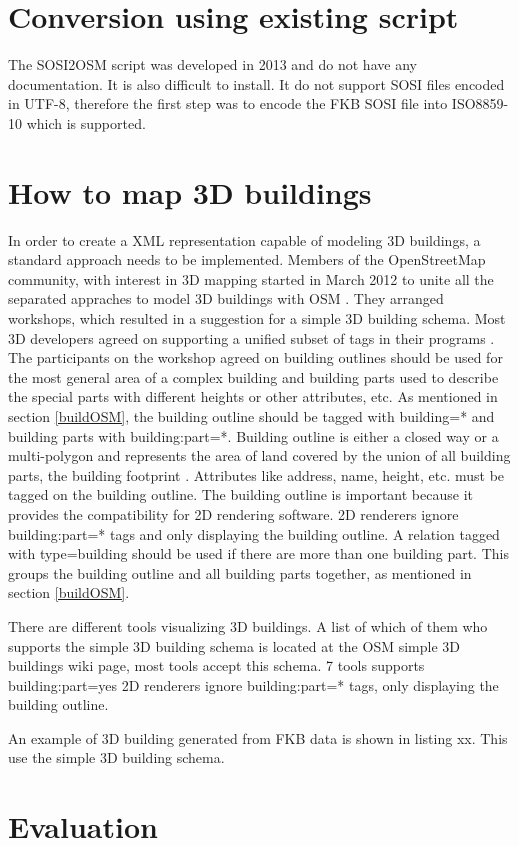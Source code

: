 \section{Conversion using existing script}

The SOSI2OSM script was developed in 2013 and do not have any documentation. It is also difficult to install. It do not support SOSI files encoded in UTF-8, therefore the first step was to encode the FKB SOSI file into ISO8859-10 which is supported. %



\section{How to map 3D buildings}
In order to create a XML representation capable of modeling 3D buildings, a standard approach needs to be implemented. Members of the OpenStreetMap community, with interest in 3D mapping started in March 2012 to unite all the separated appraches to model 3D buildings with OSM \cite{OpenStreetMapm}. They arranged workshops, which resulted in a suggestion for a simple 3D building schema. Most 3D developers agreed on supporting a unified subset of tags in their programs \cite{OpenStreetMapl}. The participants on the workshop agreed on building outlines should be used for the most general area of a complex building and building parts used to describe the special parts with different heights or other attributes, etc. As mentioned in section \ref{buildOSM}, the building outline should be tagged with building=* and building parts with building:part=*. Building outline is either a closed way or a multi-polygon and represents the area of land covered by the union of all building parts, the building footprint \cite{OSMwikipage2016}. Attributes like address, name, height, etc. must be tagged on the building outline. The building outline is important because it provides the compatibility for 2D rendering software. 2D renderers ignore building:part=* tags and only displaying the building outline. A relation tagged with type=building should be used if there are more than  one building part. This groups the building outline and all building parts together, as mentioned in section \ref{buildOSM}. 

There are different tools visualizing 3D buildings. A list of which of them who supports the simple 3D building schema is located at the OSM simple 3D buildings wiki page, most tools accept this schema. 7 tools supports building:part=yes %
2D renderers ignore building:part=* tags, only displaying the building outline. 

An example of 3D building generated from FKB data is shown in listing xx. This use the simple 3D building schema. 

\section{Evaluation}